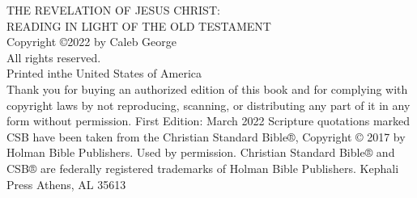 \pagestyle{empty}
\frontmatter

\titleGM

\clearpage

\begin{vplace}[2]
\noindent
THE REVELATION OF JESUS CHRIST: \\READING IN LIGHT OF THE OLD TESTAMENT\\
\newline
Copyright \copyright 2022 by Caleb George\\
All rights reserved.\\
\newline
Printed inthe United States of America\\
\newline
Thank you for buying an authorized edition of this book and for complying with copyright laws by not reproducing, scanning, or distributing any part of it in any form without permission.
\newline
\newline
First Edition: March 2022
\newline
\newline
Scripture quotations marked CSB have been taken from the Christian Standard Bible®, Copyright © 2017 by Holman Bible Publishers. Used by permission. Christian Standard Bible® and CSB® are federally registered trademarks of Holman Bible Publishers.
\newline
\newline
Kephali Press
\newline
Athens, AL 35613
\end{vplace}

\clearpage
\clearpage

\dedication
\clearpage

